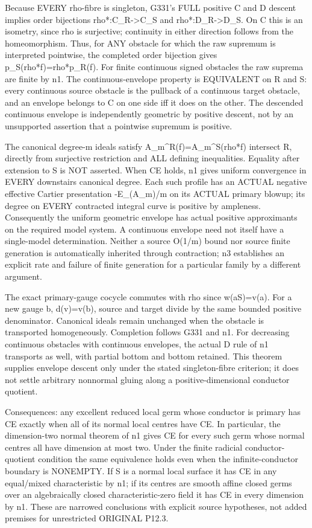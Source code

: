 Because EVERY rho-fibre is singleton, G331's FULL positive C and D descent implies order bijections rho*:C\_R-\textgreater{}C\_S and rho*:D\_R-\textgreater{}D\_S. On C this is an isometry, since rho is surjective; continuity in either direction follows from the homeomorphism. Thus, for ANY obstacle for which the raw supremum is interpreted pointwise, the completed order bijection gives p\_S(rho*f)=rho*p\_R(f). For finite continuous signed obstacles the raw suprema are finite by n1. The continuous-envelope property is EQUIVALENT on R and S: every continuous source obstacle is the pullback of a continuous target obstacle, and an envelope belongs to C on one side iff it does on the other. The descended continuous envelope is independently geometric by positive descent, not by an unsupported assertion that a pointwise supremum is positive.

The canonical degree-m ideals satisfy A\_m\textasciicircum{}R(f)=A\_m\textasciicircum{}S(rho*f) intersect R, directly from surjective restriction and ALL defining inequalities. Equality after extension to S is NOT asserted. When CE holds, n1 gives uniform convergence in EVERY downstairs canonical degree. Each such profile has an ACTUAL negative effective Cartier presentation -E\_(A\_m)/m on its ACTUAL primary blowup; its degree on EVERY contracted integral curve is positive by ampleness. Consequently the uniform geometric envelope has actual positive approximants on the required model system. A continuous envelope need not itself have a single-model determination. Neither a source O(1/m) bound nor source finite generation is automatically inherited through contraction; n3 establishes an explicit rate and failure of finite generation for a particular family by a different argument.

The exact primary-gauge cocycle commutes with rho since w(aS)=v(a). For a new gauge b, d(v)=v(b), source and target divide by the same bounded positive denominator. Canonical ideals remain unchanged when the obstacle is transported homogeneously. Completion follows G331 and n1. For decreasing continuous obstacles with continuous envelopes, the actual D rule of n1 transports as well, with partial bottom and bottom retained. This theorem supplies envelope descent only under the stated singleton-fibre criterion; it does not settle arbitrary nonnormal gluing along a positive-dimensional conductor quotient.

Consequences: any excellent reduced local germ whose conductor is primary has CE exactly when all of its normal local centres have CE. In particular, the dimension-two normal theorem of n1 gives CE for every such germ whose normal centres all have dimension at most two. Under the finite radicial conductor-quotient condition the same equivalence holds even when the infinite-conductor boundary is NONEMPTY. If S is a normal local surface it has CE in any equal/mixed characteristic by n1; if its centres are smooth affine closed germs over an algebraically closed characteristic-zero field it has CE in every dimension by n1. These are narrowed conclusions with explicit source hypotheses, not added premises for unrestricted ORIGINAL P12.3.

